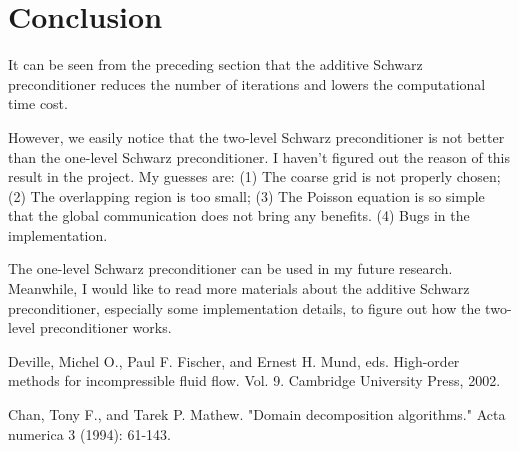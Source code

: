 \documentclass[paper=a4, fontsize=11pt]{scrartcl} %
\begin{document}
\section{Conclusion}

It can be seen from the preceding section that the additive Schwarz
preconditioner reduces the number of iterations and lowers the
computational time cost.

However, we easily notice that the two-level Schwarz preconditioner
is not better than the one-level Schwarz preconditioner. I haven't
figured out the reason of this result in the project. My guesses are:
(1) The coarse grid is not properly chosen; (2) The overlapping region
is too small; (3) The Poisson equation is so simple that the global
communication does not bring any benefits. (4) Bugs in the
implementation.

The one-level Schwarz preconditioner can be used in my future research.
Meanwhile, I would like to read more materials about the additive
Schwarz preconditioner, especially some implementation details, to
figure out how the two-level preconditioner works. 

\begin{thebibliography}{9}
Deville, Michel O., Paul F. Fischer, and Ernest H. Mund, eds. High-order methods for incompressible fluid flow. Vol. 9. Cambridge University Press, 2002.

Chan, Tony F., and Tarek P. Mathew. "Domain decomposition algorithms." Acta numerica 3 (1994): 61-143.

\end{thebibliography}
\end{document}
